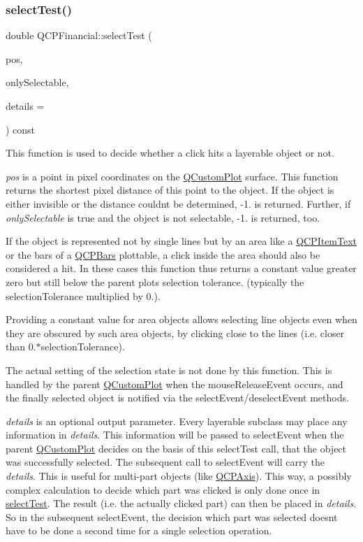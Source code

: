 \subsubsection{\texorpdfstring{select\+Test()}{selectTest()}}
{\footnotesize\ttfamily double Q\+C\+P\+Financial\+::select\+Test (\begin{DoxyParamCaption}\item[{const Q\+PointF \&}]{pos,  }\item[{bool}]{only\+Selectable,  }\item[{Q\+Variant $\ast$}]{details = {} }\end{DoxyParamCaption}) const\hspace{0.3cm}{\ttfamily [virtual]}}

This function is used to decide whether a click hits a layerable object or not.

{\itshape pos} is a point in pixel coordinates on the \hyperlink{class_q_custom_plot}{Q\+Custom\+Plot} surface. This function returns the shortest pixel distance of this point to the object. If the object is either invisible or the distance couldn\textquotesingle{}t be determined, -\/1. is returned. Further, if {\itshape only\+Selectable} is true and the object is not selectable, -\/1. is returned, too.

If the object is represented not by single lines but by an area like a \hyperlink{class_q_c_p_item_text}{Q\+C\+P\+Item\+Text} or the bars of a \hyperlink{class_q_c_p_bars}{Q\+C\+P\+Bars} plottable, a click inside the area should also be considered a hit. In these cases this function thus returns a constant value greater zero but still below the parent plot\textquotesingle{}s selection tolerance. (typically the selection\+Tolerance multiplied by 0.).

Providing a constant value for area objects allows selecting line objects even when they are obscured by such area objects, by clicking close to the lines (i.\+e. closer than 0.$\ast$selection\+Tolerance).

The actual setting of the selection state is not done by this function. This is handled by the parent \hyperlink{class_q_custom_plot}{Q\+Custom\+Plot} when the mouse\+Release\+Event occurs, and the finally selected object is notified via the select\+Event/deselect\+Event methods.

{\itshape details} is an optional output parameter. Every layerable subclass may place any information in {\itshape details}. This information will be passed to select\+Event when the parent \hyperlink{class_q_custom_plot}{Q\+Custom\+Plot} decides on the basis of this select\+Test call, that the object was successfully selected. The subsequent call to select\+Event will carry the {\itshape details}. This is useful for multi-\/part objects (like \hyperlink{class_q_c_p_axis}{Q\+C\+P\+Axis}). This way, a possibly complex calculation to decide which part was clicked is only done once in \hyperlink{class_q_c_p_financial_a77bffad8f3fcbcccbef03ead1c538e3a}{select\+Test}. The result (i.\+e. the actually clicked part) can then be placed in {\itshape details}. So in the subsequent select\+Event, the decision which part was selected doesn\textquotesingle{}t have to be done a second time for a single selection operation.

